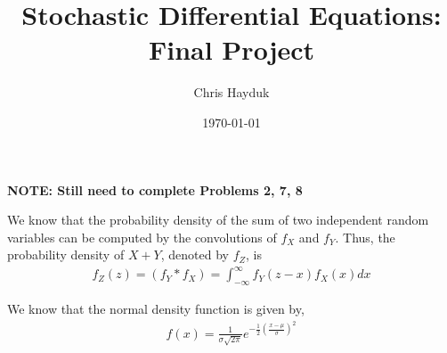 \documentclass[12pt]{article}
\newenvironment{problem}[2][Problem]{\begin{trivlist}
\item[\hskip \labelsep {\bfseries #1}\hskip \labelsep {\bfseries #2.}]}{\end{trivlist}}
\begin{document}
\title{Stochastic Differential Equations: Final Project}

\author{Chris Hayduk}
\date{\today}

\maketitle

\textbf{NOTE: Still need to complete Problems 2, 7, 8}

\begin{problem}{1}
\end{problem}

We know that the probability density of the sum of two independent random variables can be computed by the convolutions of $f_X$ and $f_Y$. Thus, the probability density of $X + Y$, denoted by $f_Z$, is
\begin{align}
f_Z(z) = (f_Y*f_X) = \int_{-\infty}^{\infty}  f_Y(z - x)f_X(x) dx
\end{align}

We know that the normal density function is given by,
\begin{align*}
f(x) = \frac{1}{\sigma\sqrt{2\pi}} e^{-\frac{1}{2}\left(\frac{x-\mu}{\sigma}\right)^2}
\end{align*}
\end{document}
